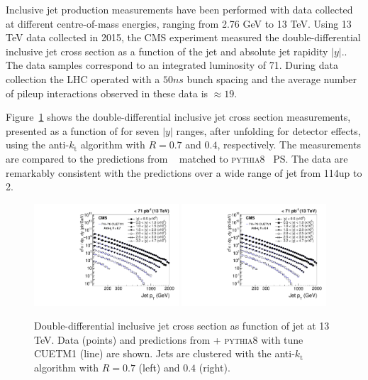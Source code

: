 \documentclass{PoS}
\providecommand{\kts}{\ensuremath{k_{\mathrm{t}}}\xspace}
\providecommand{\PYTHIAE} {{\textsc{pythia8}}\xspace}
\begin{document}
Inclusive jet production measurements have been performed with data collected at different centre-of-mass energies, ranging from 2.76 GeV to 13 TeV. 
Using 13 TeV data collected in 2015, the CMS experiment measured the double-differential inclusive jet
cross section as a function of the jet \pt and absolute jet rapidity $|y|$.\cite{Khachatryan:2016wdh}. The data samples correspond to
an integrated luminosity of 71\pbinv. During data collection the LHC operated with a $50\unit{ns}$ bunch spacing and the
average number of pileup interactions observed in these data is ${\approx}19$.   

Figure~\ref{fig:crossSection} shows the double-differential inclusive jet cross section measurements,
presented as a function of \pt for seven $|y|$ ranges, after
unfolding for detector effects, using the anti-\kts algorithm with $R =
0.7$ and $0.4$, respectively. The measurements are compared to the predictions from \POWHEG~\cite{Alioli:2010xa}
matched to \PYTHIAE~\cite{Sjostrand:2007gs} PS. The data are remarkably consistent with the predictions over a wide range of jet \pt from 114\GeV up to
2\TeV.

\begin{figure}[htbp] \centering
  \includegraphics[width=0.48\textwidth]{Figure1-a.pdf}
  \includegraphics[width=0.48\textwidth]{Figure1-b.pdf}
  \caption{Double-differential inclusive jet cross section as function of jet \pt at 13 TeV. Data (points) and
predictions from \POWHEG + \PYTHIAE with tune CUETM1 (line) are shown. Jets are clustered with the anti-\kts
algorithm with $R = 0.7$ (left) and $0.4$ (right).}
  \label{fig:crossSection}
\end{figure}
\end{document}
